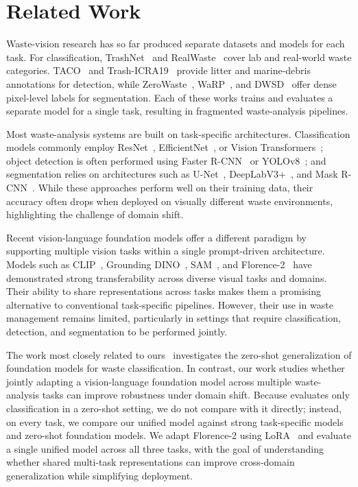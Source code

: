 \documentclass[conference]{IEEEtran}
\begin{document}
\section{Related Work}
Waste-vision research has so far produced separate datasets and models for each task.
For classification, TrashNet~\cite{trashnet} and RealWaste~\cite{realwaste} cover
lab and real-world waste categories. TACO~\cite{taco} and Trash-ICRA19~\cite{icra19}
provide litter and marine-debris annotations for detection, while ZeroWaste~\cite{zerowaste},
WaRP~\cite{warp}, and DWSD~\cite{dwsd} offer dense pixel-level labels for segmentation. Each of these
works trains and evaluates a separate model for a single task, resulting in fragmented
waste-analysis pipelines.

Most waste-analysis systems are built on task-specific architectures.
Classification models commonly employ ResNet~\cite{resnet}, EfficientNet~\cite{efficientnet},
or Vision Transformers~\cite{vit}; object detection is often performed using
Faster R-CNN~\cite{fasterrcnn} or YOLOv8~\cite{yolov8}; and segmentation relies on
architectures such as U-Net~\cite{unet}, DeepLabV3+~\cite{deeplab}, and
Mask R-CNN~\cite{maskrcnn}. While these approaches perform well on their training data,
their accuracy often drops when deployed on visually different waste environments,
highlighting the challenge of domain shift.

Recent vision-language foundation models offer a different paradigm by supporting
multiple vision tasks within a single prompt-driven architecture.
Models such as CLIP~\cite{clip}, Grounding DINO~\cite{gdino}, SAM~\cite{sam}, and
Florence-2~\cite{florence2} have demonstrated strong transferability across diverse
visual tasks and domains. Their ability to share representations across tasks makes
them a promising alternative to conventional task-specific pipelines. However, their
use in waste management remains limited, particularly in settings that require
classification, detection, and segmentation to be performed jointly.

The work most closely related to ours~\cite{babe} investigates the zero-shot
generalization of foundation models for waste classification. In contrast, our work
studies whether jointly adapting a vision-language foundation model across multiple
waste-analysis tasks can improve robustness under domain shift. Because \cite{babe}
evaluates only classification in a zero-shot setting, we do not compare with it directly;
instead, on every task, we compare our unified model against strong task-specific models
and zero-shot foundation models. We adapt Florence-2 using LoRA~\cite{lora,peft} and
evaluate a single unified model across all three tasks, with the goal of understanding
whether shared multi-task representations can improve cross-domain generalization while
simplifying deployment.
\end{document}
